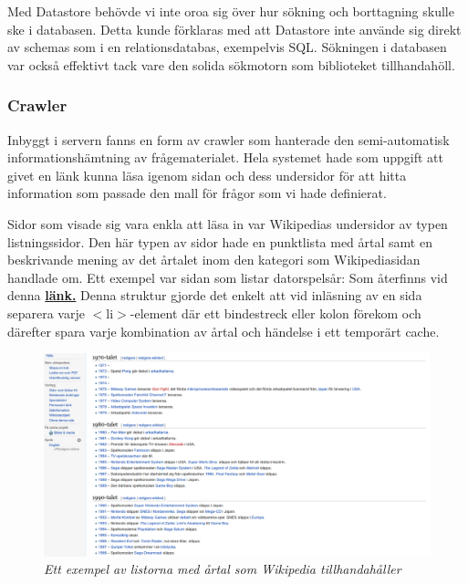\documentclass[a4paper, 11pt]{article}
\begin{document}
Med Datastore behövde vi inte oroa sig över hur sökning och borttagning skulle ske i databasen. Detta kunde förklaras med att Datastore inte använde sig direkt av schemas som i en relationsdatabas, exempelvis SQL. Sökningen i databasen var också effektivt tack vare den solida sökmotorn som biblioteket tillhandahöll.

\subsubsection{Crawler} \label{crawler}
Inbyggt i servern fanns en form av crawler som hanterade den semi-automatisk informationshämtning av frågematerialet. Hela systemet hade som uppgift att givet en länk kunna läsa igenom sidan och dess undersidor för att hitta information som passade den mall för frågor som vi hade definierat. 

Sidor som visade sig vara enkla att läsa in var Wikipedias undersidor av typen listningssidor. Den här typen av sidor hade en punktlista med årtal samt en beskrivande mening av det årtalet inom den kategori som Wikipediasidan handlade om. Ett exempel var sidan som listar datorspelsår: Som återfinns vid denna  \textbf{\href{http://sv.wikipedia.org/wiki/Lista_\%C3\%B6ver_datorspels\%C3\%A5r}{länk.}} 
Denna struktur gjorde det enkelt att vid inläsning av en sida separera varje $<$li$>$-element där ett bindestreck eller kolon förekom och därefter spara varje kombination av årtal och händelse i ett temporärt cache.

\begin{figure}[H]
	\begin{centering}
	\includegraphics[width=\textwidth]{Listbild} 
	\end{centering}
	\caption{\textit{Ett exempel av listorna med årtal som Wikipedia tillhandahåller}}
\end{figure}
\end{document}
